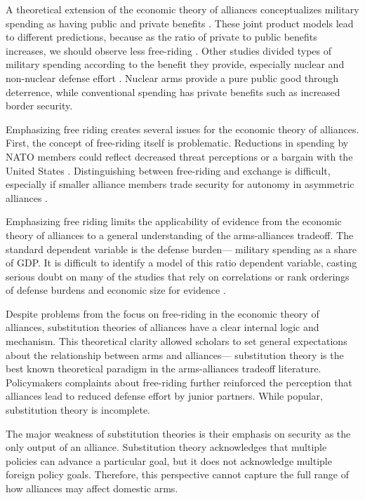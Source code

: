 \documentclass[12pt]{article}
\begin{document}
A theoretical extension of the economic theory of alliances conceptualizes military spending as having public and private benefits \citep{ConybeareSandler1990}. These joint product models lead to different predictions, because as the ratio of private to public benefits increases, we should observe less free-riding \citep{Murdoch1995, SandlerHartley2001}. Other studies divided types of military spending according to the benefit they provide, especially nuclear and non-nuclear defense effort \citep{Hansenetal1990}. Nuclear arms provide a pure public good through deterrence, while conventional spending has private benefits such as increased border security. 

Emphasizing free riding creates several issues for the economic theory of alliances. First, the concept of free-riding itself is problematic. Reductions in spending by NATO members could reflect decreased threat perceptions or a bargain with the United States \citep{Lanoszka2015}. Distinguishing between free-riding and exchange is difficult, especially if smaller alliance members trade security for autonomy in asymmetric alliances \citep{Morrow1991}. 

Emphasizing free riding limits the applicability of evidence from the economic theory of alliances to a general understanding of the arms-alliances tradeoff. The standard dependent variable is the defense burden--- military spending as a share of GDP. It is difficult to identify a model of this ratio dependent variable, casting serious doubt on many of the studies that rely on correlations or rank orderings of defense burdens and economic size for evidence \citep{PluemperNeumayer2015}. 

Despite problems from the focus on free-riding in the economic theory of alliances, substitution theories of alliances have a clear internal logic and mechanism. This theoretical clarity allowed scholars to set general expectations about the relationship between arms and alliances--- substitution theory is the best known theoretical paradigm in the arms-alliances tradeoff literature. Policymakers complaints about free-riding further reinforced the perception that alliances lead to reduced defense effort by junior partners. While popular, substitution theory is incomplete.

The major weakness of substitution theories is their emphasis on security as the only output of an alliance. Substitution theory acknowledges that multiple policies can advance a particular goal, but it does not acknowledge multiple foreign policy goals. Therefore, this perspective cannot capture the full range of how alliances may affect domestic arms. 
\end{document}
